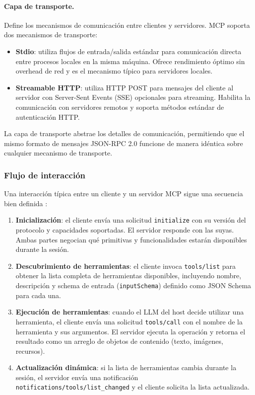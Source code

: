 \paragraph{Capa de transporte.} Define los mecanismos de comunicación entre
clientes y servidores. MCP soporta dos mecanismos de transporte:

\begin{itemize}
    \item \textbf{Stdio}: utiliza flujos de entrada/salida estándar para
    comunicación directa entre procesos locales en la misma máquina. Ofrece
    rendimiento óptimo sin overhead de red y es el mecanismo típico para
    servidores locales.

    \item \textbf{Streamable HTTP}: utiliza HTTP POST para mensajes del cliente
    al servidor con Server-Sent Events (SSE) opcionales para streaming.
    Habilita la comunicación con servidores remotos y soporta métodos estándar
    de autenticación HTTP.
\end{itemize}

La capa de transporte abstrae los detalles de comunicación, permitiendo que el
mismo formato de mensajes JSON-RPC 2.0 funcione de manera idéntica sobre
cualquier mecanismo de transporte.

\subsubsection{Flujo de interacción}

Una interacción típica entre un cliente y un servidor MCP sigue una secuencia
bien definida \citep{mcpspec2024}:

\begin{enumerate}
    \item \textbf{Inicialización}: el cliente envía una solicitud
    \texttt{initialize} con su versión del protocolo y capacidades soportadas.
    El servidor responde con las suyas. Ambas partes negocian qué primitivas
    y funcionalidades estarán disponibles durante la sesión.

    \item \textbf{Descubrimiento de herramientas}: el cliente invoca
    \texttt{tools/list} para obtener la lista completa de herramientas
    disponibles, incluyendo nombre, descripción y schema de entrada
    (\texttt{inputSchema}) definido como JSON Schema para cada una.

    \item \textbf{Ejecución de herramientas}: cuando el LLM del host decide
    utilizar una herramienta, el cliente envía una solicitud
    \texttt{tools/call} con el nombre de la herramienta y sus argumentos. El
    servidor ejecuta la operación y retorna el resultado como un arreglo de
    objetos de contenido (texto, imágenes, recursos).

    \item \textbf{Actualización dinámica}: si la lista de herramientas cambia
    durante la sesión, el servidor envía una notificación
    \texttt{notifications/tools/list\_changed} y el cliente solicita la lista
    actualizada.
\end{enumerate}

